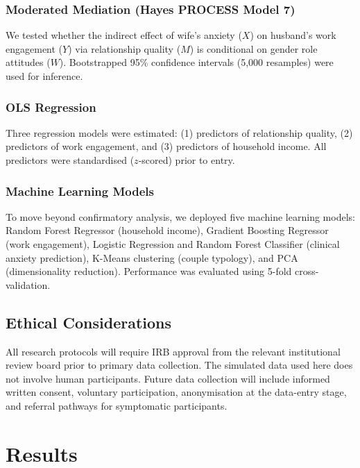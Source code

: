 \documentclass[12pt, a4paper]{article}
\begin{document}
\subsubsection{Moderated Mediation (Hayes PROCESS Model 7)}
We tested whether the indirect effect of wife's anxiety ($X$) on husband's work engagement ($Y$) via relationship quality ($M$) is conditional on gender role attitudes ($W$). Bootstrapped 95\% confidence intervals (5,000 resamples) were used for inference.

\subsubsection{OLS Regression}
Three regression models were estimated: (1) predictors of relationship quality, (2) predictors of work engagement, and (3) predictors of household income. All predictors were standardised ($z$-scored) prior to entry.

\subsubsection{Machine Learning Models}
To move beyond confirmatory analysis, we deployed five machine learning models: Random Forest Regressor (household income), Gradient Boosting Regressor (work engagement), Logistic Regression and Random Forest Classifier (clinical anxiety prediction), K-Means clustering (couple typology), and PCA (dimensionality reduction). Performance was evaluated using 5-fold cross-validation.

\subsection{Ethical Considerations}

All research protocols will require IRB approval from the relevant institutional review board prior to primary data collection. The simulated data used here does not involve human participants. Future data collection will include informed written consent, voluntary participation, anonymisation at the data-entry stage, and referral pathways for symptomatic participants.


\section{Results}\label{sec:results}
\end{document}
